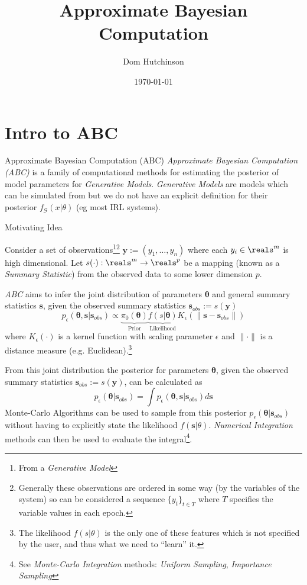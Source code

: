 \documentclass[11pt,a4paper]{article}
\begin{document}
\title{Approximate Bayesian Computation}
\author{Dom Hutchinson}
\date{\today}
\maketitle

\tableofcontents

\section{Intro to ABC}

  \begin{definition}{Approximate Bayesian Computation (ABC)}
    \textit{Approximate Bayesian Computation (ABC)} is a family of computational methods for estimating the posterior of model parameters for \textit{Generative Models}. \textit{Generative Models} are models which can be simulated from but we do not have an explicit definition for their posterior $f_\mathcal{G}(x|\theta)$ (eg most IRL systems).
  \end{definition}

  \begin{proposition}{Motivating Idea\cite{ABC_Annual_Review}}
    \par Consider a set of observations\footnote{From a \textit{Generative Model}}\footnote{Generally these observations are ordered in some way (by the variables of the system) so can be considered a sequence $\{y_t\}_{t\in T}$ where $T$ specifies the variable values in each epoch.} $\mathbf{y}:=(y_1,\dots,y_n)$ where each $y_i\in\reals^m$ is high dimensional. Let $s(\cdot):\reals^m\to\reals^p$ be a mapping (known as a \textit{Summary Statistic}) from the observed data to some lower dimension $p$.
    \par \textit{ABC} aims to infer the joint distribution of parameters $\pmb\theta$ and general summary statistics $\mathbf{s}$, given the observed summary statistics $\mathbf{s}_{obs}:=s(\mathbf{y})$
    \[ p_\epsilon(\pmb\theta,\mathbf{s}|\mathbf{s}_{obs})\propto\underbrace{\pi_0(\pmb\theta)}_\text{Prior}\underbrace{f(s|\pmb\theta)}_\text{Likelihood}K_\epsilon(\|\mathbf{s}-\mathbf{s}_{obs}\|) \]
    where $K_\epsilon(\cdot)$ is a kernel function with scaling parameter $\epsilon$ and $\|\cdot\|$ is a distance measure (e.g. Euclidean).\footnote{The likelihood $f(s|\theta)$ is the only one of these features which is not specified by the user, and thus what we need to ``learn'' it.}
    \par From this joint distribution the posterior for parameters $\pmb\theta$, given the observed summary statistics $\mathbf{s}_{obs}:=s(\mathbf{y})$, can be calculated as
    \[ p_\epsilon(\pmb\theta|\mathbf{s}_{obs})=\int p_\epsilon(\pmb\theta,\mathbf{s}|\mathbf{s}_{obs})d\mathbf{s} \]
    Monte-Carlo Algorithms can be used to sample from this posterior $p_\epsilon(\pmb\theta|\mathbf{s}_{obs})$ without having to explicitly state the likelihood $f(\mathbf{s}|\theta)$. \textit{Numerical Integration} methods can then be used to evaluate the integral\footnote{See \textit{Monte-Carlo Integration} methods: \textit{Uniform Sampling}, \textit{Importance Sampling}}.
  \end{proposition}
\end{document}
